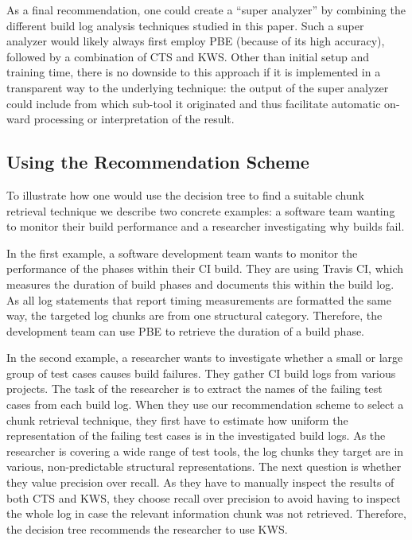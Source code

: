 As a final recommendation, one could create a ``super analyzer'' by
combining the different build log analysis techniques studied in this
paper.
Such a super analyzer would likely always first employ PBE
(because of its high accuracy), followed by a combination of CTS and
KWS\@.
Other than initial setup and training time, there is no
downside to this approach if it is implemented in a transparent way to
the underlying technique: the output of the super analyzer could
include from which sub-tool it originated and thus facilitate
automatic on-ward processing or interpretation of the result.


\subsection{Using the Recommendation Scheme}

To illustrate how one would use the decision tree to find a suitable
chunk retrieval technique we describe two concrete examples: a software
team
wanting to monitor their build performance and a
researcher investigating why builds fail.

In the first example, a software development team wants to monitor
the performance of the phases within their CI build.
They are using
Travis CI, which measures the duration of build phases and documents
this within the build log.
As all log statements that report timing
measurements are formatted the same way, the targeted log chunks are
from one structural category.
Therefore, the development team can use
PBE to retrieve the duration of a build phase.

In the second example, a researcher wants to investigate whether a small
or large group of test cases
causes build failures.
They gather
CI build logs from various projects.
The task of the researcher is to extract the names of the
failing test cases from each build log.
When they use our
recommendation scheme to select a chunk retrieval technique, they
first have to estimate how uniform the representation of the failing
test cases is in the investigated build logs.
As the researcher is
covering a wide range of test tools, the
log chunks they target are in various, non-predictable structural
representations.
The next question is whether they value precision
over recall.
As they have to manually inspect the results of both CTS
and KWS, they choose recall over precision to avoid having to inspect
the whole log in case the relevant information chunk was not
retrieved.
Therefore, the decision tree recommends the researcher to use KWS\@.

